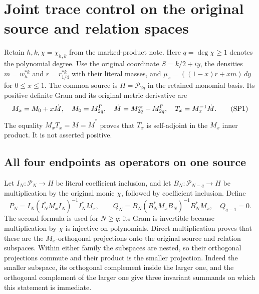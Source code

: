 \documentclass[11pt,a4paper]{article}
\begin{document}
\clearpage

\section{Joint trace control on the original source and relation spaces}
\label{sec:signed-projection-control}

Retain \(h,k,\chi=\chi_{h,k}\) from the marked-product note. Here
\(q=\deg\chi\geq1\) denotes the polynomial degree. Use the original
coordinate \(S=k/2+iy\), the densities \(m=w_h^{*k}\) and
\(r=r_{1/4}^{*k}\) with their literal masses, and
\(\mu_x=((1-x)r+xm)\,dy\) for \(0\leq x\leq1\).
The common source is \(H=\mathcal P_{2q}\) in the retained monomial basis.
Its positive definite Gram and its original metric derivative are
\[
 M_x=M_0+x\dot M,\quad M_0=M^\Gamma_{2q},\quad
 \dot M=M^{\rm ar}_{2q}-M^\Gamma_{2q},\quad
 T_x=M_x^{-1}\dot M .
 \tag{SP1}
\]
The equality \(M_xT_x=\dot M=\dot M^*\) proves that \(T_x\) is
self-adjoint in the \(M_x\) inner product. It is not asserted positive.

\subsection{All four endpoints as operators on one source}
Let \(I_N:\mathcal P_N\to H\) be literal coefficient inclusion, and
let \(B_N:\mathcal P_{N-q}\to H\) be multiplication by the original
monic \(\chi\), followed by coefficient inclusion. Define
\[
 P_N=I_N(I_N^*M_xI_N)^{-1}I_N^*M_x,\qquad
 Q_N=B_N(B_N^*M_xB_N)^{-1}B_N^*M_x,\quad Q_{q-1}=0 .
 \tag{SP2}
\]
The second formula is used for \(N\geq q\); its Gram is invertible
because multiplication by \(\chi\) is injective on polynomials.
Direct multiplication proves that these are the \(M_x\)-orthogonal
projections onto the original source and relation subspaces.
Within either family the subspaces are nested, so their orthogonal
projections commute and their product is the smaller projection.
Indeed the smaller subspace, its orthogonal complement inside the
larger one, and the orthogonal complement of the larger one give
three invariant summands on which this statement is immediate.
\end{document}
